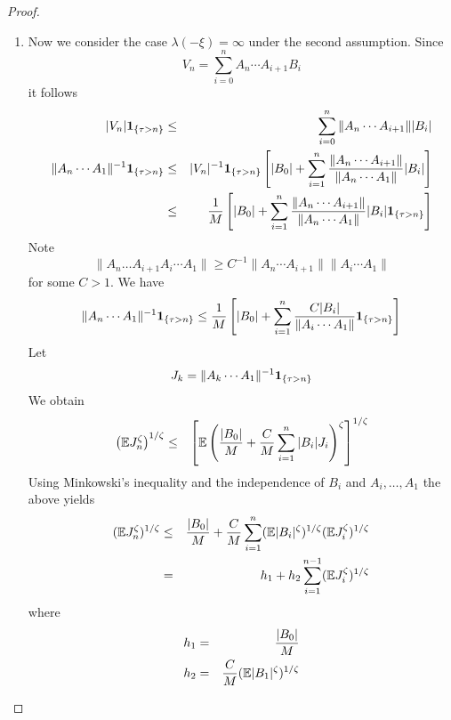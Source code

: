 \documentclass{article}
\theoremstyle{remark}
\begin{document}
\begin{proof}
\begin{enumerate}
  \item Now we consider the case $\lambda(-\xi) = \infty$ under
    the second assumption.
    Since
    \[
    V_n = \sum_{i=0}^n A_n \cdots A_{i+1} B_i
    \]
    it follows
    \begin{eqnarray*}
      |V_n|\mathbf{1}_{\{\tau > n\}} &\leq&
      \sum_{i=0}^{n} \|A_n \cdots A_{i+1}\| |B_i| \\
      \|A_n \cdots A_1\|^{-1} \mathbf{1}_{\{\tau > n\}}
      &\leq& |V_n|^{-1} \mathbf{1}_{\{\tau > n\}}
      \left[
        |B_0| + \sum_{i=1}^n {
          \|A_n \cdots A_{i+1}\|
          \over
          \|A_n \cdots A_{1}\|
        } |B_i|
      \right] \\
      &\leq& {1 \over M}
      \left[
        |B_0| + \sum_{i=1}^n {
          \|A_n \cdots A_{i+1}\|
          \over
          \|A_n \cdots A_{1}\|
        } |B_i| \mathbf{1}_{\{\tau > n\}}
      \right]
    \end{eqnarray*}
    Note
    \[
    \|A_n \dots A_{i+1} A_i \cdots A_1\| \geq
    C^{-1} \|A_n \cdots A_{i+1}\|
    \|A_i \cdots A_{1}\|
    \]
    for some $C > 1$. We have
    \begin{equation}
      \label{eq:lower_bound}
      \|A_n \cdots A_1\|^{-1} \mathbf{1}_{\{\tau > n\}}
      \leq
      {1 \over M} \left[
        |B_0| + \sum_{i=1}^n {
          C |B_i|
          \over
          \|A_i \cdots A_1\|
        }  \mathbf{1}_{\{\tau > n\}}
      \right]
    \end{equation}
    Let
    \[
    J_k = \|A_k \cdots A_1\|^{-1} \mathbf{1}_{\{\tau > n\}}
    \]
    We obtain
    \begin{eqnarray*}
      \left(
        \mathbb{E} J_n^\zeta
      \right)^{1/\zeta} &\leq& \left[
        \mathbb{E} \left(
          {|B_0| \over M}
          + {C \over M} \sum_{i=1}^n |B_i| J_i
        \right)^\zeta
        \right]^{1/\zeta}
    \end{eqnarray*}
    Using Minkowski's inequality and the independence of $B_i$ and
    $A_i, \dots, A_1$ the above yields
    \begin{eqnarray}
      (\mathbb{E} J_n^\zeta)^{1/\zeta} &\leq&
      {|B_0| \over M} + {C \over M}
      \sum_{i=1}^n
      (\mathbb{E} |B_i|^\zeta)^{1/\zeta}
      (\mathbb{E} J_i^\zeta)^{1/\zeta}
      \label{eq:neg_pow_ub} \\
      &=& h_1 + h_2 \sum_{i=1}^{n-1} (\mathbb{E} J_i^\zeta)^{1/\zeta}
      \nonumber
    \end{eqnarray}
    where
    \begin{eqnarray*}
      h_1 &=& {|B_0| \over M} \\
      h_2 &=& {C \over M} (\mathbb{E} |B_1|^\zeta)^{1/\zeta}
    \end{eqnarray*}

\end{enumerate}
\end{proof}
\end{document}

